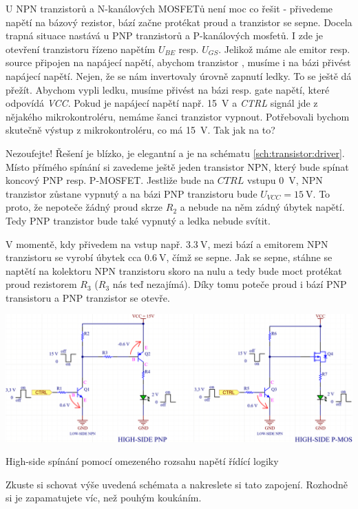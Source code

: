 \documentclass[a4paper,12pt]{article}   %
\begin{document}
U NPN tranzistorů a N-kanálových MOSFETů není moc co řešit - přivedeme napětí na bázový rezistor, bází začne protékat proud a tranzistor se sepne. Docela trapná situace nastává u PNP tranzistorů a P-kanálových mosfetů. I zde je otevření tranzistoru řízeno napětím $U_{BE}$ resp. $U_{GS}$. Jelikož máme ale emitor resp. source připojen na napájecí napětí, abychom tranzistor , musíme i na bázi přivést napájecí napětí. Nejen, že se nám invertovaly úrovně zapnutí ledky. To se ještě dá přežít. Abychom vypli ledku, musíme přivést na bázi resp. gate napětí, které odpovídá \textit{VCC}. Pokud je napájecí napětí např. 15~V a \textit{CTRL} signál jde z nějakého mikrokontroléru, nemáme šanci tranzistor vypnout. Potřebovali bychom skutečně výstup z mikrokontroléru, co má 15~V. Tak jak na to?

Nezoufejte! Řešení je blízko, je elegantní a je na schématu \ref{sch:transistor:driver}. Místo přímého spínání si zavedeme ještě jeden transistor NPN, který bude spínat koncový PNP resp. P-MOSFET. Jestliže bude na $CTRL$ vstupu 0~V, NPN tranzistor zůstane vypnutý a na bázi PNP tranzistoru bude $U_{VCC} = 15~\text{V}$. To proto, že nepoteče žádný proud skrze $R_2$ a nebude na něm zádný úbytek napětí. Tedy PNP tranzistor bude také vypnutý a ledka nebude svítit. 

V momentě, kdy přivedem na vstup např. $3.3~\text{V}$, mezi bází a emitorem NPN tranzistoru se vyrobí úbytek cca $0.6~\text{V}$, čímž se sepne. Jak se sepne, stáhne se naptětí na kolektoru NPN tranzistoru skoro na nulu a tedy bude moct protékat proud rezistorem $R_3$ ($R_3$ nás teď nezajímá). Díky tomu poteče proud i bází PNP transistoru a PNP tranzistor se otevře.

\begin{schema}
    \centering
    \includegraphics[width=.7\textwidth]{tranzistory-spinace_driver.PNG}
    \caption{High-side spínání pomocí omezeného rozsahu napětí řídící logiky}
    \label{sch:transistor:driver}
\end{schema}

Zkuste si schovat výše uvedená schémata a nakreslete si tato zapojení. Rozhodně si je zapamatujete víc, než pouhým koukáním.
\end{document}
